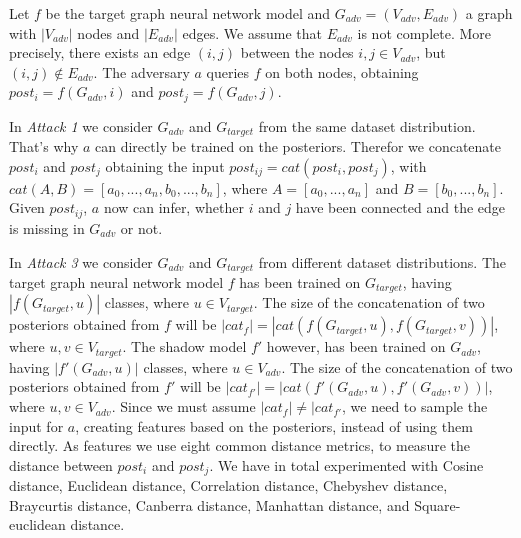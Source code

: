     Let $f$ be the target graph neural network model and $G_{adv} = (V_{adv}, E_{adv})$ a graph with $|V_{adv}|$ nodes and $|E_{adv}|$ edges.
    We assume that $E_{adv}$ is not complete. 
    More precisely, there exists an edge $(i,j)$ between the nodes $i,j \in V_{adv}$, but $(i,j) \not\in E_{adv}$.
    The adversary $a$ queries $f$ on both nodes, obtaining $post_i = f(G_{adv}, i)$ and $post_j = f(G_{adv}, j)$.

    In \emph{Attack 1} we consider $G_{adv}$ and $G_{target}$ from the same dataset distribution.
    That's why $a$ can directly be trained on the posteriors. 
    Therefor we concatenate $post_i$ and $post_j$ obtaining the input $post_{ij} = cat(post_i, post_j)$, with $cat(A,B) = [a_0,...,a_n,b_0,...,b_n]$, where $A = [a_0,...,a_n]$ and $B = [b_0,...,b_n]$.
    Given $post_{ij}$, $a$ now can infer, whether $i$ and $j$ have been connected and the edge is missing in $G_{adv}$ or not.

    In \emph{Attack 3} we consider $G_{adv}$ and $G_{target}$ from different dataset distributions.
    The target graph neural network model $f$ has been trained on $G_{target}$, having $|f(G_{target},u)|$ classes, where $u \in V_{target}$.
    The size of the concatenation of two posteriors obtained from $f$ will be $|cat_{f}| = |cat(f(G_{target},u), f(G_{target},v))|$, where $u,v \in V_{target}$. 
    The shadow model $f'$ however, has been trained on $G_{adv}$, having $|f'(G_{adv},u)|$ classes, where $u \in V_{adv}$.
    The size of the concatenation of two posteriors obtained from $f'$ will be $|cat_{f'}| = |cat(f'(G_{adv},u), f'(G_{adv},v))|$, where $u,v \in V_{adv}$. 
    Since we must assume $|cat_{f}| \neq |cat_{f'}$, we need to sample the input for $a$, creating features based on the posteriors, instead of using them directly.
    As features we use eight common distance metrics, to measure the distance between $post_i$ and $post_j$.
    We have in total experimented with Cosine distance, Euclidean distance, Correlation distance, Chebyshev distance, Braycurtis distance, Canberra distance, Manhattan distance, and Square-euclidean distance.

